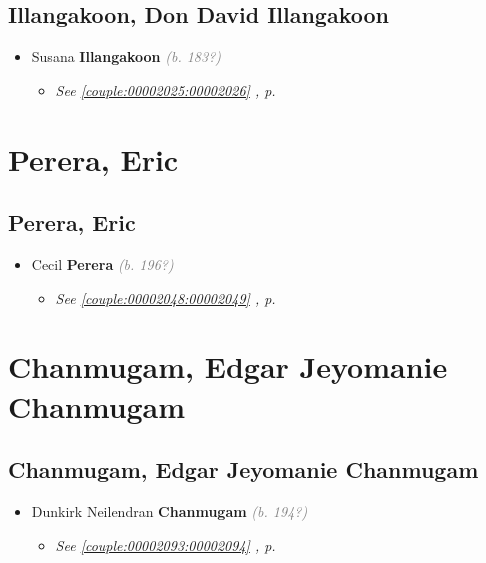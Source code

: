 \documentclass[10pt, openany]{book}
\begin{document}
\chapter{Illangakoon, Don David Illangakoon}
\label{00002027}
\textcolor{slmaroon}{\textit{}}
\begin{itemize}
\item{Susana \textbf{Illangakoon} \textcolor{gray}{\textit{(b. 183?)}}
\begin{itemize}
\item{\textcolor{slteal}{\textit{See  \autoref{couple:00002025:00002026} \textit{, p. \pageref{couple:00002025:00002026} }}}}
\end{itemize}
 }
\end{itemize}
   
\part{Perera, Eric}
\chapter{Perera, Eric}
\label{00002050}
\textcolor{slmaroon}{\textit{}}
\begin{itemize}
\item{Cecil \textbf{Perera} \textcolor{gray}{\textit{(b. 196?)}}
\begin{itemize}
\item{\textcolor{slteal}{\textit{See  \autoref{couple:00002048:00002049} \textit{, p. \pageref{couple:00002048:00002049} }}}}
\end{itemize}
 }
\end{itemize}
 
\part{Chanmugam, Edgar Jeyomanie Chanmugam}
\chapter{Chanmugam, Edgar Jeyomanie Chanmugam}
\label{00002095}
\textcolor{slmaroon}{\textit{}}
\begin{itemize}
\item{Dunkirk Neilendran \textbf{Chanmugam} \textcolor{gray}{\textit{(b. 194?)}}
\begin{itemize}
\item{\textcolor{slteal}{\textit{See  \autoref{couple:00002093:00002094} \textit{, p. \pageref{couple:00002093:00002094} }}}}
\end{itemize}
  }
\end{itemize}
   
\end{document}
